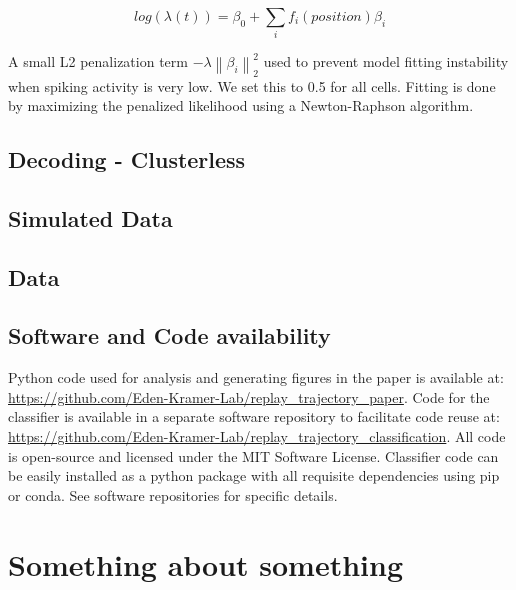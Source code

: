 \documentclass[times, twoside, watermark]{zHenriquesLab-StyleBioRxiv}
\newcommand{\norm}[1]{\left\lVert #1 \right\rVert}
\begin{document}
$$log(\lambda(t)) = \beta_{0} + \sum_{i} f_{i}(position)\beta_{i}$$

A small L2 penalization term $-\lambda\norm{\beta_{i}}_{2}^{2}$ used to prevent model fitting instability when spiking activity is very low. We set this to 0.5 for all cells. Fitting is done by maximizing the penalized likelihood using a Newton-Raphson algorithm.

\subsection*{Decoding - Clusterless}


\subsection*{Simulated Data}

\subsection*{Data}

\subsection*{Software and Code availability}
Python code used for analysis and generating figures in the paper is available at: \url{https://github.com/Eden-Kramer-Lab/replay_trajectory_paper}. Code for the classifier is available in a separate software repository to facilitate code reuse at: \url{https://github.com/Eden-Kramer-Lab/replay_trajectory_classification}. All code is open-source and licensed under the MIT Software License. Classifier code can be easily installed as a python package with all requisite dependencies using pip or conda. See software repositories for specific details.

\newpage

\captionsetup*{format=largeformat}
\section{Something about something} \label{note:Note1} 
\Blindtext
\end{document}

